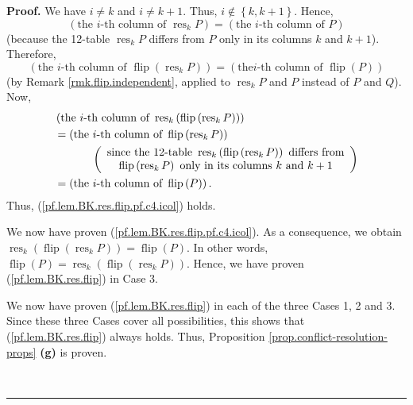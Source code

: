 \documentclass[numbers=enddot,12pt,final,onecolumn,notitlepage]{scrartcl}%
\theoremstyle{definition}
\newenvironment{proof}[1][Proof]{\noindent\textbf{#1.} }{\ \rule{0.5em}{0.5em}}
\begin{document}
\begin{proof}
We have $i\neq k$ and $i\neq k+1$. Thus, $i\notin\left\{  k,k+1\right\}  $.
Hence,%
\[
\left(  \text{the }i\text{-th column of }\operatorname*{res}\nolimits_{k}%
P\right)  =\left(  \text{the }i\text{-th column of }P\right)
\]
(because the 12-table $\operatorname*{res}\nolimits_{k}P$ differs from $P$
only in its columns $k$ and $k+1$). Therefore,%
\[
\left(  \text{the }i\text{-th column of }\operatorname*{flip}\left(
\operatorname*{res}\nolimits_{k}P\right)  \right)  =\left(  \text{the
}i\text{-th column of }\operatorname*{flip}\left(  P\right)  \right)
\]
(by Remark \ref{rmk.flip.independent}, applied to $\operatorname*{res}%
\nolimits_{k}P$ and $P$ instead of $P$ and $Q$). Now,%
\begin{align*}
&  \left(  \text{the }i\text{-th column of }\operatorname*{res}\nolimits_{k}%
\left(  \operatorname*{flip}\left(  \operatorname*{res}\nolimits_{k}P\right)
\right)  \right) \\
&  =\left(  \text{the }i\text{-th column of }\operatorname*{flip}\left(
\operatorname*{res}\nolimits_{k}P\right)  \right) \\
&  \ \ \ \ \ \ \ \ \ \ \left(
\begin{array}
[c]{c}%
\text{since the 12-table }\operatorname*{res}\nolimits_{k}\left(
\operatorname*{flip}\left(  \operatorname*{res}\nolimits_{k}P\right)  \right)
\text{ differs from}\\
\operatorname*{flip}\left(  \operatorname*{res}\nolimits_{k}P\right)  \text{
only in its columns }k\text{ and }k+1
\end{array}
\right) \\
&  =\left(  \text{the }i\text{-th column of }\operatorname*{flip}\left(
P\right)  \right)  .
\end{align*}
Thus, (\ref{pf.lem.BK.res.flip.pf.c4.icol}) holds.

We now have proven (\ref{pf.lem.BK.res.flip.pf.c4.icol}). As a consequence, we
obtain $\operatorname*{res}\nolimits_{k}\left(  \operatorname*{flip}\left(
\operatorname*{res}\nolimits_{k}P\right)  \right)  =\operatorname*{flip}%
\left(  P\right)  $. In other words, $\operatorname*{flip}\left(  P\right)
=\operatorname*{res}\nolimits_{k}\left(  \operatorname*{flip}\left(
\operatorname*{res}\nolimits_{k}P\right)  \right)  $. Hence, we have proven
(\ref{pf.lem.BK.res.flip}) in Case 3.

We now have proven (\ref{pf.lem.BK.res.flip}) in each of the three Cases 1, 2
and 3. Since these three Cases cover all possibilities, this shows that
(\ref{pf.lem.BK.res.flip}) always holds. Thus, Proposition
\ref{prop.conflict-resolution-props} \textbf{(g)} is proven.


\end{proof}
\end{document}
